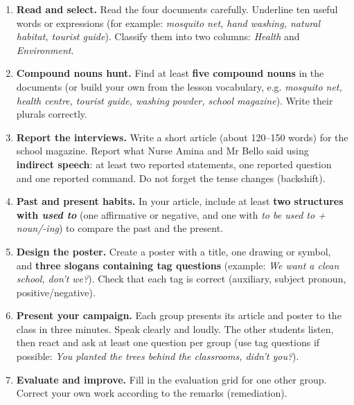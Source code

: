 \documentclass[11pt]{article}
\newcounter{popsec}
\newcounter{popsub}
\newcommand{\courssub}[1]{%
  \stepcounter{popsub}%
  \par\vspace{9pt}\noindent{\popxbold\fontsize{11.5}{13}\selectfont\color{popink}{\color{poporange}\thepopsec.\thepopsub}\hspace{6pt}#1}\par\nopagebreak\vspace{4pt}
}
\begin{document}
\begin{enumerate}
\item \textbf{Read and select.} Read the four documents carefully. Underline ten useful words or expressions (for example: \emph{mosquito net, hand washing, natural habitat, tourist guide}). Classify them into two columns: \emph{Health} and \emph{Environment}.

\item \textbf{Compound nouns hunt.} Find at least \textbf{five compound nouns} in the documents (or build your own from the lesson vocabulary, e.g. \emph{mosquito net, health centre, tourist guide, washing powder, school magazine}). Write their plurals correctly.

\item \textbf{Report the interviews.} Write a short article (about 120--150 words) for the school magazine. Report what Nurse Amina and Mr Bello said using \textbf{indirect speech}: at least two reported statements, one reported question and one reported command. Do not forget the tense changes (backshift).

\item \textbf{Past and present habits.} In your article, include at least \textbf{two structures with \emph{used to}} (one affirmative or negative, and one with \emph{to be used to + noun/-ing}) to compare the past and the present.

\item \textbf{Design the poster.} Create a poster with a title, one drawing or symbol, and \textbf{three slogans containing tag questions} (example: \emph{We want a clean school, don't we?}). Check that each tag is correct (auxiliary, subject pronoun, positive/negative).

\item \textbf{Present your campaign.} Each group presents its article and poster to the class in three minutes. Speak clearly and loudly. The other students listen, then react and ask at least one question per group (use tag questions if possible: \emph{You planted the trees behind the classrooms, didn't you?}).

\item \textbf{Evaluate and improve.} Fill in the evaluation grid for one other group. Correct your own work according to the remarks (remediation).
\end{enumerate}

\courssub{Ressources à mobiliser}
\end{document}
